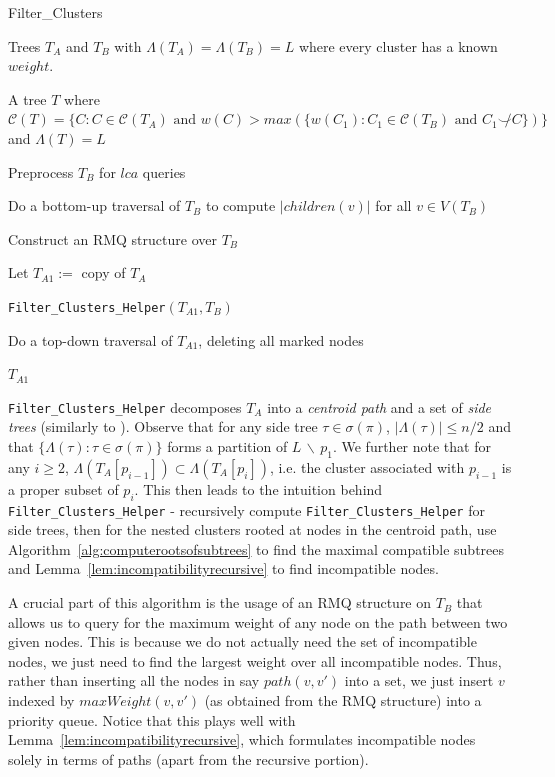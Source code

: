 \documentclass{article}
\newcommand{\compatible}{\smile}
\newcommand{\leafset}{\Lambda}
\begin{document}
    \begin{algorithm}
        \caption{Filter\_Clusters}
        \begin{algorithmic}[1]
            \Input Trees $T_A$ and $T_B$ with $\leafset(T_A) = \leafset(T_B) = L$ where every cluster has a known $weight$.

            \Output A tree $T$ where $\mathcal{C}(T) = \{C : C \in \mathcal{C}(T_A) \text{ and } w(C) > max(\{w(C_1) : C_1 \in \mathcal{C}(T_B) \text{ and } C_1 \not\compatible C\})\}$ and $\leafset(T) = L$

            \State Preprocess $T_B$ for $lca$ queries

            \State Do a bottom-up traversal of $T_B$ to compute $|children(v)|$ for all $v \in V(T_B)$

            \State Construct an RMQ structure over $T_B$

            \State Let $T_{A1} :=$ copy of $T_A$

            \State \texttt{Filter\_Clusters\_Helper}$(T_{A1}, T_B)$

            \State Do a top-down traversal of $T_{A1}$, deleting all marked nodes

            \State \Return $T_{A1}$
        \end{algorithmic}
    \end{algorithm}

    \texttt{Filter\_Clusters\_Helper} decomposes $T_A$ into a \textit{centroid path} and a set of \textit{side trees} (similarly to \cite{jansson2018algorithms}). Observe that for any side tree $\tau \in \sigma(\pi)$, $|\leafset(\tau)| \leq n/2$ and that $\{\leafset(\tau) : \tau \in \sigma(\pi)\}$ forms a partition of $L\, \backslash\, {p_1}$. We further note that for any $i \geq 2$, $\leafset(T_A[p_{i - 1}]) \subset \leafset(T_A[p_i])$, i.e. the cluster associated with $p_{i-1}$ is a proper subset of $p_i$. This then leads to the intuition behind \texttt{Filter\_Clusters\_Helper} - recursively compute \texttt{Filter\_Clusters\_Helper} for side trees, then for the nested clusters rooted at nodes in the centroid path, use Algorithm~\ref{alg:computerootsofsubtrees} to find the maximal compatible subtrees and Lemma~\ref{lem:incompatibilityrecursive} to find incompatible nodes.

    A crucial part of this algorithm is the usage of an RMQ structure on $T_B$ that allows us to query for the maximum weight of any node on the path between two given nodes. This is because we do not actually need the set of incompatible nodes, we just need to find the largest weight over all incompatible nodes. Thus, rather than inserting all the nodes in say $path(v, v')$ into a set, we just insert $v$ indexed by $maxWeight(v, v')$ (as obtained from the RMQ structure) into a priority queue. Notice that this plays well with Lemma~\ref{lem:incompatibilityrecursive}, which formulates incompatible nodes solely in terms of paths (apart from the recursive portion).
\end{document}
